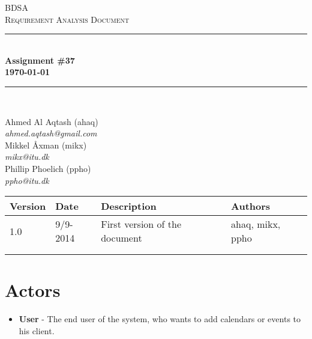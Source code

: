 \documentclass[10pt]{report}
\numberwithin{equation}{section} %
\numberwithin{figure}{section} %
\numberwithin{table}{section} %
\newcommand{\HRule}{\rule{\linewidth}{0.5mm}}
\begin{document}
\begin{titlepage}

\begin{center}

\textsc{\LARGE BDSA}\\[1.5cm]

\textsc{\Large Requirement Analysis Document}\\[0.5cm]

\HRule \\[0.4cm]

{ \bfseries Assignment \#37 \\[0.5cm] 
    {\small \today}} \\[0.7cm]

\HRule \\ [6.5cm]

\begin{minipage}{0.5\textwidth}
\begin{flushleft} \large
Ahmed Al Aqtash (ahaq)\\
\textit{ahmed.aqtash@gmail.com}\\
Mikkel Åxman (mikx)\\
\textit{mikx@itu.dk}\\
Phillip Phoelich (ppho)\\
\textit{ppho@itu.dk}\\

\vfill 
\end{flushleft}
\end{minipage}

\end{center}

\end{titlepage}
\clearpage
\begin{table}[h]
\begin{tabularx}{\textwidth}{l l X l}
\textbf{Version} & \textbf{Date} & \textbf{Description} & \textbf{Authors} \\ \midrule
1.0     & 9/9-2014 & First version of the document & ahaq, mikx, ppho  \\
        &          &                               & \\
        &          &                               & \\
\end{tabularx}
\end{table}

\clearpage
\section{Actors}
\begin{itemize}
\item \textbf{User} - The end user of the system, who wants to add calendars or
  events to his client.
\end{itemize}
\end{document}
